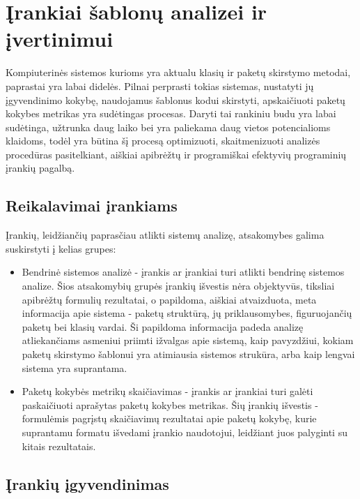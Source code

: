 \section{Įrankiai šablonų analizei ir įvertinimui}
Kompiuterinės sistemos kurioms yra aktualu klasių ir paketų skirstymo metodai, paprastai yra labai didelės.
Pilnai perprasti tokias sistemas, nustatyti jų įgyvendinimo kokybę, naudojamus šablonus kodui skirstyti,
apskaičiuoti paketų kokybes metrikas yra sudėtingas procesas.
Daryti tai rankiniu budu yra labai sudėtinga, užtrunka daug laiko bei yra paliekama daug vietos potencialioms klaidoms,
todėl yra būtina šį procesą optimizuoti, skaitmenizuoti analizės procedūras pasitelkiant,
aiškiai apibrėžtų ir programiškai efektyvių programinių įrankių pagalbą.

\subsection{Reikalavimai įrankiams}
Įrankių, leidžiančių paprasčiau atlikti sistemų analizę, atsakomybes galima suskirstyti į kelias grupes:
\begin{itemize}
    \item Bendrinė sistemos analizė - įrankis ar įrankiai turi atlikti bendrinę sistemos analize.
    Šios atsakomybių grupės įrankių išvestis nėra objektyvūs, tiksliai apibrėžtų formulių rezultatai, o papildoma, aiškiai
    atvaizduota, meta informacija apie sistema - paketų struktūrą, jų priklausomybes, figuruojančių paketų bei klasių vardai.
    Ši papildoma informacija padeda analizę atliekančiams asmeniui priimti ižvalgas apie sistemą, kaip pavyzdžiui,
    kokiam paketų skirstymo šablonui yra atimiausia sistemos strukūra,
    arba kaip lengvai sistema yra suprantama.
    \item Paketų kokybės metrikų skaičiavimas - įrankis ar įrankiai turi galėti paskaičiuoti aprašytas paketų kokybes metrikas.
    Šių įrankių išvestis - formulėmis pagrįstų skaičiavimų rezultatai apie paketų kokybę, kurie suprantamu formatu išvedami įrankio naudotojui,
    leidžiant juos palyginti su kitais rezultatais.
\end{itemize}
\subsection{Įrankių įgyvendinimas}